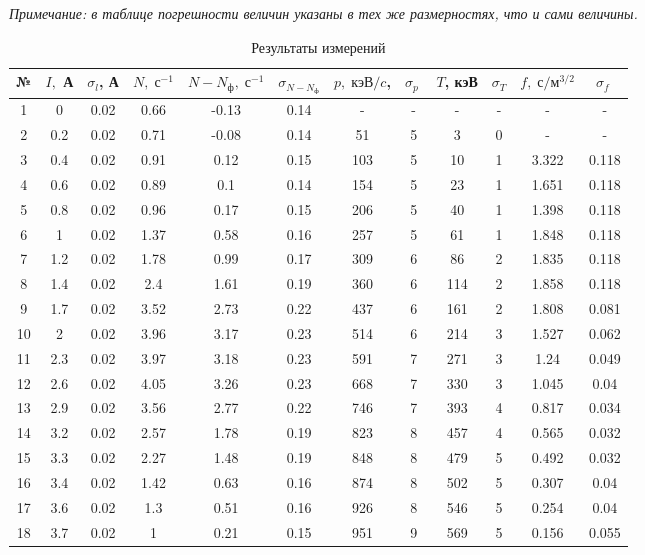\documentclass[12pt]{kiarticle} %
\begin{document}
\textit{Примечание: в таблице погрешности величин указаны в тех же размерностях, что и сами величины.}

\begin{table}[h!]
	\caption{Результаты измерений}
	\begin{center}
		\begin{tabular}{|c|c|c|c|c|c|c|c|c|c|c|c|}
			\hline
			№ & $ I, $ А & $ \sigma_l $, А & $ N, \; с^{-1} $ & $ N - N_ф,  \; с^{-1} $ & $ \sigma_{N-N_ф}$  & $ p, \; кэВ/c $,  & $ \sigma_p \;  $  & $ T $, кэВ & $ \sigma_T $ & $ f, \; с/м^{3/2 } $& $ \sigma_f \;$\\
			\hline
1 & 0 & 0.02 & 0.66 & -0.13 & 0.14 & - & - & - & - & - &- \\
2 & 0.2 & 0.02 & 0.71 & -0.08 & 0.14 & 51 & 5 & 3 & 0 & - & - \\
3 & 0.4 & 0.02 & 0.91 & 0.12 & 0.15 & 103 & 5 & 10 & 1 & 3.322 & 0.118 \\
4 & 0.6 & 0.02 & 0.89 & 0.1 & 0.14 & 154 & 5 & 23 & 1 & 1.651 & 0.118 \\
5 & 0.8 & 0.02 & 0.96 & 0.17 & 0.15 & 206 & 5 & 40 & 1 & 1.398 & 0.118 \\
6 & 1 & 0.02 & 1.37 & 0.58 & 0.16 & 257 & 5 & 61 & 1 & 1.848 & 0.118 \\
7 & 1.2 & 0.02 & 1.78 & 0.99 & 0.17 & 309 & 6 & 86 & 2 & 1.835 & 0.118 \\
8 & 1.4 & 0.02 & 2.4 & 1.61 & 0.19 & 360 & 6 & 114 & 2 & 1.858 & 0.118 \\
9 & 1.7 & 0.02 & 3.52 & 2.73 & 0.22 & 437 & 6 & 161 & 2 & 1.808 & 0.081 \\
10 & 2 & 0.02 & 3.96 & 3.17 & 0.23 & 514 & 6 & 214 & 3 & 1.527 & 0.062 \\
11 & 2.3 & 0.02 & 3.97 & 3.18 & 0.23 & 591 & 7 & 271 & 3 & 1.24 & 0.049 \\
12 & 2.6 & 0.02 & 4.05 & 3.26 & 0.23 & 668 & 7 & 330 & 3 & 1.045 & 0.04 \\
13 & 2.9 & 0.02 & 3.56 & 2.77 & 0.22 & 746 & 7 & 393 & 4 & 0.817 & 0.034 \\
14 & 3.2 & 0.02 & 2.57 & 1.78 & 0.19 & 823 & 8 & 457 & 4 & 0.565 & 0.032 \\
15 & 3.3 & 0.02 & 2.27 & 1.48 & 0.19 & 848 & 8 & 479 & 5 & 0.492 & 0.032 \\
16 & 3.4 & 0.02 & 1.42 & 0.63 & 0.16 & 874 & 8 & 502 & 5 & 0.307 & 0.04 \\
17 & 3.6 & 0.02 & 1.3 & 0.51 & 0.16 & 926 & 8 & 546 & 5 & 0.254 & 0.04 \\
18 & 3.7 & 0.02 & 1 & 0.21 & 0.15 & 951 & 9 & 569 & 5 & 0.156 & 0.055 \\

\end{tabular}
\end{center}
\end{table}
\end{document}
